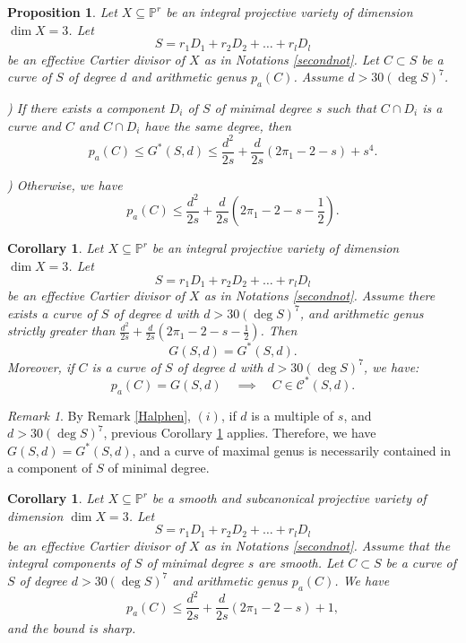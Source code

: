 \documentclass[9pt,a4paper]{amsart}
\theoremstyle{plain}
\newtheorem{proposition}[theorem]{Proposition}
\newtheorem{corollary}[theorem]{Corollary}
\theoremstyle{definition}
\theoremstyle{remark}
\newtheorem{remark}[theorem]{Remark}
\begin{document}
\smallskip
\begin{proposition}\label{refined} Let $X\subseteq \mathbb P^r$
be an integral projective variety of dimension $\dim X=3$. Let
$$
S=r_1D_1 + r_2D_2 +\dots + r_lD_l
$$
be an effective Cartier divisor of $X$ as in Notations
\ref{secondnot}. Let $C\subset S$ be a curve of $S$ of degree $d$
and arithmetic genus $p_a(C)$. Assume $d>30(\deg S)^7$.

) If there exists a component $D_i$ of $S$ of minimal degree $s$
such that $C\cap D_i$ is a curve and $C$ and $C\cap D_i$ have the
same degree, then
$$
p_a(C) \leq G^*(S,d) \leq
\frac{d^2}{2s}+\frac{d}{2s}(2\pi_1-2-s)+s^4.
$$

) Otherwise, we have
$$
p_a(C) \leq
\frac{d^2}{2s}+\frac{d}{2s}\left(2\pi_1-2-s-\frac{1}{2}\right).
$$
\end{proposition}


\smallskip
\begin{corollary}\label{intcompl} Let $X\subseteq \mathbb P^r$
be an integral projective variety of dimension $\dim X=3$. Let
$$
S=r_1D_1 + r_2D_2 +\dots + r_lD_l
$$
be an effective Cartier divisor of $X$ as in Notations
\ref{secondnot}. Assume there exists a curve of $S$ of degree $d$
with $d>30(\deg S)^7$, and arithmetic genus strictly greater  than
$\frac{d^2}{2s}+\frac{d}{2s}\left(2\pi_1-2-s-\frac{1}{2}\right)$.
Then
$$
G(S,d)=G^*(S,d).
$$
Moreover, if $C$ is a curve of $S$ of degree $d$ with $d>30(\deg
S)^7$, we have:
$$
p_a(C)=G(S,d)\quad \implies \quad C\in \mathcal C^*(S,d).
$$
\end{corollary}

\smallskip
\begin{remark}
By Remark \ref{Halphen}, $(i)$, if $d$ is a multiple of $s$, and
$d>30(\deg S)^7$, previous Corollary \ref{intcompl} applies.
Therefore, we have  $G(S,d)=G^*(S,d)$, and a curve of maximal genus
is necessarily contained in a component of $S$ of minimal degree.
\end{remark}

\smallskip
\begin{corollary}\label{CY} Let $X\subseteq \mathbb P^r$
be a smooth and subcanonical projective variety of dimension $\dim
X=3$. Let
$$
S=r_1D_1 + r_2D_2 +\dots + r_lD_l
$$
be an effective Cartier divisor of $X$ as in Notations
\ref{secondnot}. Assume that the integral components of $S$ of
minimal degree $s$ are smooth. Let $C\subset S$ be a curve of $S$ of
degree $d>30(\deg S)^7$ and arithmetic genus $p_a(C)$. We have
$$
p_a(C)\leq \frac{d^2}{2s}+\frac{d}{2s}(2\pi_1-2-s)+1,
$$
and the bound is sharp.
\end{corollary}
\end{document}
